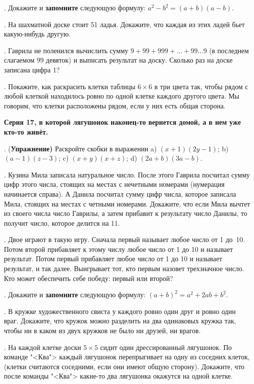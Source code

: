 .  Докажите и {\bf запомните} следующую формулу: $a^2-b^2=(a+b)(a-b)$. 

. На шахматной доске стоит 51 ладья. Докажите, что каждая из этих ладей
бьет какую-нибудь другую.

. Гаврила не поленился вычислить сумму
$9 + 99 + 999 + \dots + 99...9$
(в последнем слагаемом 99 девяток) и выписать результат на доску.
Сколько раз на доске записана цифра 1?

. Покажите, как раскрасить клетки таблицы $6\times 6$ в три цвета так,
чтобы рядом с любой клеткой находилось ровно по одной клетке каждого
другого цвета. Мы говорим, что клетки расположены рядом, если у них
есть общая сторона.

\centerline{\bf Серия 17, в которой лягушонок наконец-то вернется домой, а в нем уже кто-то живёт.}

. ({\bf Упражнение)} Раскройте скобки в выражении a) $(x+1)(2y-1)$; 
b) $(a-1)(z-3)$; c) $(x+y)(x+z)$; d) $(2a+b)(3a-b)$.

. Кузина Мила записала натуральное число. 
После этого Гаврила посчитал сумму цифр этого числа, стоящих на местах с нечетными номерами (нумерация начинается справа). 
А Данила посчитал сумму цифр числа, которое записала Мила, стоящих на местах с четными номерами. 
Докажите, что если Мила вычтет из своего числа число Гаврилы, а затем прибавит к результату число Данилы, то 
получит число, которое делится на 11. 

. Двое играют в такую игру. Сначала первый называет любое число от 1 до~10.
Потом второй прибавляет к этому числу любое число от 1 до 10 и называет результат.
Потом первый прибавляет любое число от 1 до 10 и называет результат, и так далее.
Выигрывает тот, кто первым назовет трехзначное число.
Кто может обеспечить себе победу: первый или второй?

.  Докажите и {\bf запомните} следующую формулу: $(a+b)^2=a^2+2ab+b^2$.

. В кружке художественного свиста у каждого ровно один друг и ровно один
враг. Докажите, что кружок можно разделить на два одинаковых кружка так, чтобы ни в каком
из двух кружков не было ни друзей, ни врагов.

.  На каждой клетке доски $5\times 5$ сидит один дрессированный лягушонок.
По команде "<Ква"> каждый лягушонок перепрыгивает на одну из соседних клеток,
(клетки считаются соседними, если они имеют общую сторону). Докажите, что
после команды "<Ква"> какие-то два лягушонка окажутся на одной клетке.

